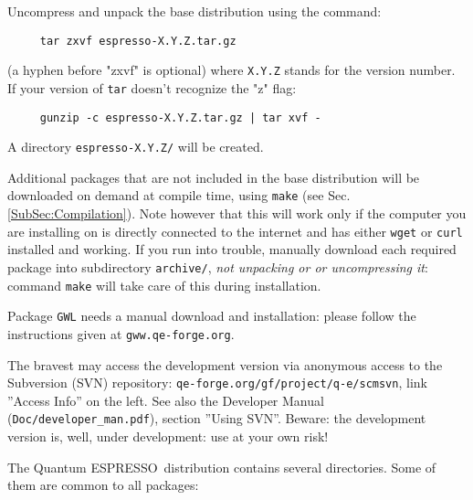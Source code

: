 \documentclass[12pt,a4paper]{article}
\def\qe{{\sc Quantum ESPRESSO}}
\begin{document}
Uncompress and unpack the base distribution using the command:
\begin{verbatim}
     tar zxvf espresso-X.Y.Z.tar.gz
\end{verbatim}
(a hyphen before "zxvf" is optional) where \texttt{X.Y.Z} stands for the
version number. If your version of \texttt{tar} 
doesn't recognize the "z" flag:
\begin{verbatim}
     gunzip -c espresso-X.Y.Z.tar.gz | tar xvf -
\end{verbatim}
A directory \texttt{espresso-X.Y.Z/} will be created. 

Additional packages that are not included in the base distribution
will be downloaded on demand at compile time, using \texttt{make} 
(see Sec.\ref{SubSec:Compilation}).
Note however that this will work only if the computer you are 
installing on is directly connected to the internet and has
either \texttt{wget} or \texttt{curl} installed and working. 
If you run into trouble, manually download each required package 
into subdirectory \texttt{archive/}, {\em not unpacking or
or uncompressing it}:
command \texttt{make} will take care of this during installation. 

Package \texttt{GWL} needs a manual download and installation:
please follow the instructions given at \texttt{gww.qe-forge.org}.



The bravest may access the development version via anonymous access to the
Subversion (SVN) repository: \texttt{qe-forge.org/gf/project/q-e/scmsvn}, 
link ''Access Info'' on the left. See also the Developer Manual
(\texttt{Doc/developer\_man.pdf}), section ''Using SVN''.
Beware: the development version 
is, well, under development: use at your own risk! 

The \qe\ distribution contains several directories. Some of them are
common to all packages:
\end{document}
